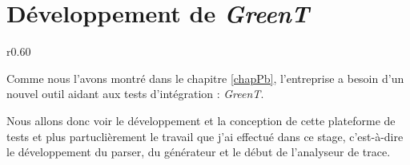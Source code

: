 \chapter{Développement de \textit{\textit{GreenT}}}\label{chapGreent}
\begin{wrapfigure}{r}{0.60\textwidth}
\vspace{-25px}
\begin{minipage}{0.60\textwidth}
\minitoc
\end{minipage}
\end{wrapfigure}

Comme nous l'avons montré dans le chapitre \ref{chapPb}, l'entreprise a besoin d'un nouvel outil aidant aux tests d'intégration : \textit{GreenT}. 

Nous allons donc voir le développement et la conception de cette plateforme de tests et plus partuclièrement le travail que j'ai effectué dans ce stage, c'est-à-dire le développement du parser, du générateur et le début de l'analyseur de trace.

	
	
	
	